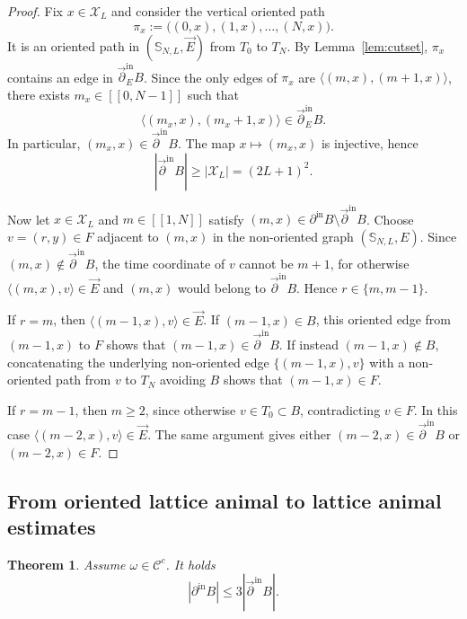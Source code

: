 \documentclass[11pt]{amsart}
\newtheorem{theorem}{Theorem}[section]
\theoremstyle{definition}
\numberwithin{equation}{section}
\newcommand{\Sbb}{\mathbb{S}}
\newcommand{\mrm}[1]{\mathrm{#1}}
\newcommand{\1}{\mathbbm{1}}
\newcommand{\arrow}[1]{\overrightarrow{#1}}
\newcommand{\arpartial}{\arrow{\partial}}
\newcommand{\Chi}{\mathcal{X}}
\begin{document}
\begin{proof}
Fix $x\in\Chi_L$ and consider the vertical oriented path
\[
\pi_x:=\bigl((0,x),(1,x),\dots,(N,x)\bigr).
\]
It is an oriented path in $(\Sbb_{N,L},\arrow{E})$ from $T_0$ to $T_N$.
By Lemma~\ref{lem:cutset}, $\pi_x$ contains an edge in $\arpartial_E^{\mrm{in}} B$.
Since the only edges of $\pi_x$ are $\langle(m,x),(m+1,x)\rangle$, there exists $m_x\in[\![0,N-1]\!]$ such that
\[
\langle(m_x,x),(m_x+1,x)\rangle\in \arpartial_E^{\mrm{in}} B.
\]
In particular, $(m_x,x)\in\arpartial^{\mrm{in}} B$. The map $x\mapsto (m_x,x)$ is injective, hence
\[
|\arpartial^{\mrm{in}} B|\ge |\Chi_L|=(2L+1)^2.
\]

Now let $x\in \Chi_L$ and $m\in[\![1,N]\!]$ satisfy
$(m,x)\in \partial^{\mrm{in}} B\setminus \arpartial^{\mrm{in}} B$. Choose $v=(r,y)\in F$ adjacent to $(m,x)$ in the non-oriented graph
$(\Sbb_{N,L},E)$. Since $(m,x)\notin \arpartial^{\mrm{in}} B$, the time coordinate of $v$ cannot be $m+1$, for otherwise
$\langle (m,x),v\rangle\in \arrow{E}$ and $(m,x)$ would belong to $\arpartial^{\mrm{in}} B$.
Hence $r\in\{m,m-1\}$.

If $r=m$, then $\langle (m-1,x),v\rangle\in \arrow{E}$. If
$(m-1,x)\in B$, this oriented edge from $(m-1,x)$ to $F$ shows that
$(m-1,x)\in \arpartial^{\mrm{in}} B$. If instead $(m-1,x)\notin B$, concatenating
the underlying non-oriented edge $\{(m-1,x),v\}$ with a non-oriented path from
$v$ to $T_N$ avoiding $B$ shows that $(m-1,x)\in F$.

If $r=m-1$, then $m\ge 2$, since otherwise $v\in T_0\subset B$, contradicting
$v\in F$. In this case $\langle (m-2,x),v\rangle\in \arrow{E}$. The same
argument gives either $(m-2,x)\in \arpartial^{\mrm{in}} B$ or
$(m-2,x)\in F$.
\end{proof}


\subsection{From oriented lattice animal to lattice animal estimates}

\begin{theorem}\label{thm:oriented-animal-to-animal}
Assume $\omega\in\mathcal C^c$. It holds
\[
|\partial^{\mrm{in}} B|\leq 3|\arpartial^{\mrm{in}} B|.
\]
\end{theorem}
\end{document}
